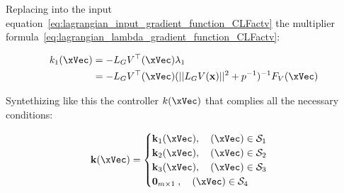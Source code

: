 Replacing into the input equation~\ref{eq:lagrangian_input_gradient_function_CLFactv} the  multiplier formula~\ref{eq:lagrangian_lambda_gradient_function_CLFactv}:

\begin{align}
    k_1(\xVec)  &= -L_GV^{\top}(\xVec) \lambda_1 \notag \\
    &= -L_GV^{\top}(\xVec) (||L_GV(\mathbf{x})||^2 + p^{-1})^{-1} F_V(\xVec) \label{eq:CLFConstraintsActvController} 
\end{align}

Syntethizing like this the controller \(k(\xVec)\) that complies all the necessary conditions:

\begin{equation}
    \mathbf{k}(\xVec ) =
    \begin{cases}
        \mathbf{k}_1(\xVec ), \quad (\xVec ) \in \mathcal{S}_1 \\
        \mathbf{k}_2(\xVec ), \quad (\xVec ) \in \mathcal{S}_2 \\
        \mathbf{k}_3(\xVec ), \quad (\xVec ) \in \mathcal{S}_3 \\
        \mathbf{0}_{m \times 1 }   \hspace{0.25em}, \quad (\xVec ) \in \mathcal{S}_4
    \end{cases}
    \label{eq:closed-form_controller_deduc}
\end{equation}







